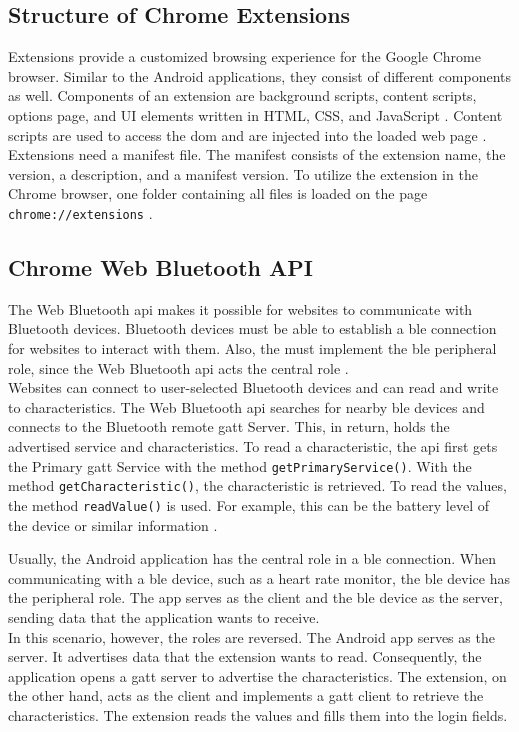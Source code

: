 \subsection{Structure of Chrome Extensions}
Extensions provide a customized browsing experience for the Google Chrome browser. Similar to the Android applications, they consist of different components as well. Components of an extension are background scripts, content scripts, options page, and UI elements written in HTML, CSS, and JavaScript \cite{Extensions}. Content scripts are used to access the \gls{dom} and are injected into the loaded web page \cite{DBLP:conf/ndss/LiuZYC12}. \\
Extensions need a manifest file. The manifest consists of the extension name, the version, a description, and a manifest version. To utilize the extension in the Chrome browser, one folder containing all files is loaded on the page \texttt{chrome://extensions} \cite{Extensions}.


\subsection{Chrome Web Bluetooth API}
The Web Bluetooth \gls{api} makes it possible for websites to communicate with Bluetooth devices. Bluetooth devices must be able to establish a \gls{ble} connection for websites to interact with them. Also, the must implement the \gls{ble} peripheral role, since the Web Bluetooth \gls{api} acts the central role \cite{BTAPIMozilla}. \\
Websites can connect to user-selected Bluetooth devices and can read and write to characteristics. The Web Bluetooth \gls{api} searches for nearby \gls{ble} devices and connects to the Bluetooth remote \gls{gatt} Server. This, in return, holds the advertised service and characteristics. To read a characteristic, the \gls{api} first gets the Primary \gls{gatt} Service with the method \texttt{getPrimaryService()}. With the method \texttt{getCharacteristic()}, the characteristic is retrieved. To read the values, the method \texttt{readValue()} is used. For example, this can be the battery level of the device or similar information \cite{WebBTAPI}.

Usually, the Android application has the central role in a \gls{ble} connection. When communicating with a \gls{ble} device, such as a heart rate monitor, the \gls{ble} device has the peripheral role. The app serves as the client and the \gls{ble} device as the server, sending data that the application wants to receive. \\
In this scenario, however, the roles are reversed. The Android app serves as the server. It advertises data that the extension wants to read. Consequently, the application opens a \gls{gatt} server to advertise the characteristics. The extension, on the other hand, acts as the client and implements a \gls{gatt} client to retrieve the characteristics. The extension reads the values and fills them into the login fields. \\